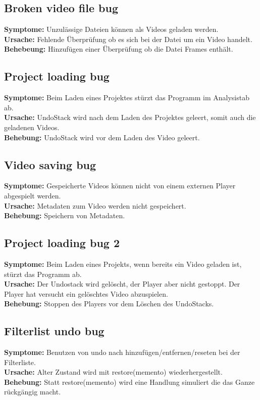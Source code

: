 \documentclass{scrartcl}
\begin{document}
{\subsection{Broken video file bug}
\textbf{Symptome:} Unzulässige Dateien können als Videos geladen werden.\\
\textbf{Ursache:} Fehlende Überprüfung ob es sich bei der Datei um ein Video handelt.\\
\textbf{Behebeung:} Hinzufügen einer Überprüfung ob die Datei Frames enthält.
\subsection{Project loading bug}
\textbf{Symptome:} Beim Laden eines Projektes stürzt das Programm im Analysistab ab.\\
\textbf{Ursache:} UndoStack wird nach dem Laden des Projektes geleert, somit auch die geladenen Videos.\\
\textbf{Behebung:} UndoStack wird vor dem Laden des Video geleert.
\subsection{Video saving bug}
\textbf{Symptome:}
Gespeicherte Videos können nicht von einem externen Player abgespielt werden.\\
\textbf{Ursache:}
Metadaten zum Video werden nicht gespeichert.\\
\textbf{Behebung:}
Speichern von Metadaten.
\subsection{Project loading bug 2}
\textbf{Symptome:}
Beim Laden eines Projekts, wenn bereits ein Video geladen ist, stürzt das Programm ab.\\
\textbf{Ursache:}
Der Undostack wird gelöscht, der Player aber nicht gestoppt. Der Player hat versucht ein gelöschtes Video abzuspielen.\\
\textbf{Behebung:}
Stoppen des Players vor dem Löschen des UndoStacks.\\
\subsection{Filterlist undo bug}
\textbf{Symptome:}
Benutzen von undo nach hinzufügen/entfernen/reseten bei der Filterliste.\\
\textbf{Ursache:}
Alter Zustand wird mit restore(memento) wiederhergestellt.\\
\textbf{Behebung:}
Statt restore(memento) wird eine Handlung simuliert die das Ganze rückgängig macht.
\newpage
}
\end{document}
